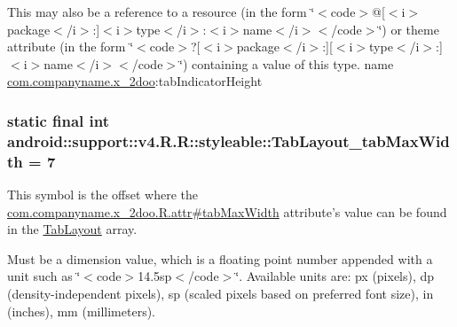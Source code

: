 This may also be a reference to a resource (in the form \char`\"{}$<$code$>$@\mbox{[}$<$i$>$package$<$/i$>$:\mbox{]}$<$i$>$type$<$/i$>$:$<$i$>$name$<$/i$>$$<$/code$>$\char`\"{}) or theme attribute (in the form \char`\"{}$<$code$>$?\mbox{[}$<$i$>$package$<$/i$>$:\mbox{]}\mbox{[}$<$i$>$type$<$/i$>$:\mbox{]}$<$i$>$name$<$/i$>$$<$/code$>$\char`\"{}) containing a value of this type.  name \hyperlink{namespacecom_1_1companyname_1_1x__2doo}{com.companyname.x\_\-2doo}:tabIndicatorHeight \hypertarget{classandroid_1_1support_1_1v4_1_1_r_1_1styleable_8e0718dd07664eb909dcf60018ef5c49}{
\subsubsection[{TabLayout\_\-tabMaxWidth}]{\setlength{\rightskip}{0pt plus 5cm}static final int android::support::v4.R.R::styleable::TabLayout\_\-tabMaxWidth = 7}}
\label{classandroid_1_1support_1_1v4_1_1_r_1_1styleable_8e0718dd07664eb909dcf60018ef5c49}


This symbol is the offset where the \hyperlink{classcom_1_1companyname_1_1x__2doo_1_1_r_1_1attr_59ed64d2fb44e09534446455a797d37b}{com.companyname.x\_\-2doo.R.attr\#tabMaxWidth} attribute's value can be found in the \hyperlink{classandroid_1_1support_1_1v4_1_1_r_1_1styleable_d1f1104cdc4fac0ab4797d48f7efe351}{TabLayout} array.

Must be a dimension value, which is a floating point number appended with a unit such as \char`\"{}$<$code$>$14.5sp$<$/code$>$\char`\"{}. Available units are: px (pixels), dp (density-independent pixels), sp (scaled pixels based on preferred font size), in (inches), mm (millimeters). 

